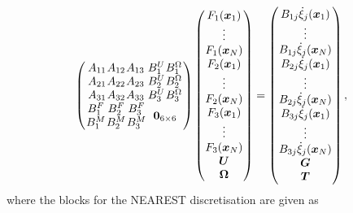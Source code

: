 \begin{equation}
\label{eq:swimmingStructure}
\arraycolsep=0.4pt\def\arraystretch{1}
\left(
\begin{array}{cc}
\begin{array}{ccc}
A_{11} & A_{12} & A_{13} \\
A_{21} & A_{22} & A_{23} \\
A_{31} & A_{32} & A_{33}
\end{array} &
\begin{array}{cc}
B_{1}^{U} & B_{1}^{\Omega} \\
B_{2}^{U} & B_{2}^{\Omega} \\
B_{3}^{U} & B_{3}^{\Omega} \\
\end{array} \\
\begin{array}{ccc}
B_{1}^{F} & B_{2}^{F} & B_{3}^{F} \\
B_{1}^{M} & B_{2}^{M} & B_{3}^{M}
\end{array} & \bm{0}_{6 \times 6}
\end{array}
\right)
\left(\begin{array}{c}
F_{1}({\bm{x}}_{1}) \\
\vdots \\
F_{1}({\bm{x}}_{N}) \\
F_{2}({\bm{x}}_{1}) \\
\vdots \\
F_{2}({\bm{x}}_{N}) \\
F_{3}({\bm{x}}_{1}) \\
\vdots \\
F_{3}({\bm{x}}_{N}) \\
\boldsymbol{U} \\
\boldsymbol{\Omega}
\end{array}\right)=\left(\begin{array}{c}
B_{1 j} \dot{\xi}_{j}({\bm{x}}_{1}) \\
\vdots \\
B_{1 j} \dot{\xi}_{j}({\bm{x}}_{N}) \\
B_{2 j} \dot{\xi}_{j}({\bm{x}}_{1}) \\
\vdots \\
B_{2 j} \dot{\xi}_{j}({\bm{x}}_{N}) \\
B_{3 j} \dot{\xi}_{j}({\bm{x}}_{1}) \\
\vdots \\
B_{3 j}\dot{\xi}_{j}({\bm{x}}_{N}) \\
\bm{G} \\
\bm{T}
\end{array}\right),
\end{equation}
where the blocks for the NEAREST discretisation are given as

